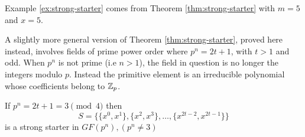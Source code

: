 Example \ref{ex:strong-starter} comes from Theorem \ref{thm:strong-starter} with $m = 5$ and $x = 5$.

A slightly more general version of Theorem \ref{thm:strong-starter}, proved here instead, involves fields of prime power order where $p^{n} = 2t + 1$, with $t > 1$ and odd.
When $p^{n}$ is not prime (i.e $n > 1$), the field in question is no longer the integers modulo $p$.
Instead the primitive element is an irreducible polynomial whose coefficients belong to $\mathbb{Z}_{p}$.

\begin{theorem}
\label{thm:strong-starter-2}
If $p^n = 2t + 1 = 3\pmod 4$ then
\begin{equation*}
S = \{\{x^0, x^1\}, \{x^2, x^3\}, \ldots, \{x^{2t - 2}, x^{2t - 1}\}\}
\end{equation*}
is a strong starter in $GF(p^n), (p^n \neq 3)$
\end{theorem}

